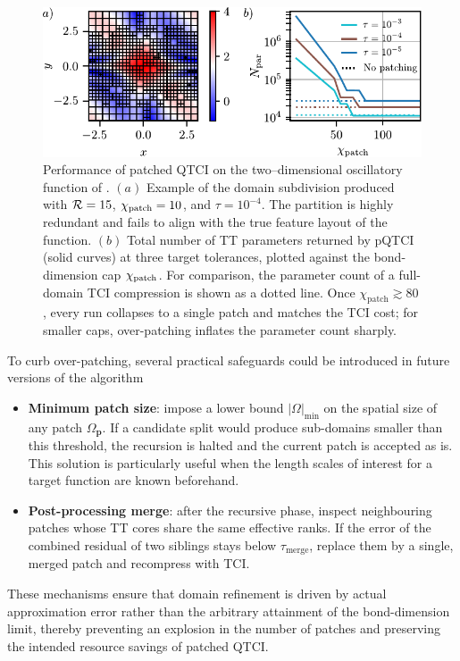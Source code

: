 \begin{figure}[htbp]
	\centering
	\includegraphics{figures/OverPatching.pdf}
	\caption{Performance of patched QTCI on the two–dimensional oscillatory function of .  $(a)$ Example of the domain subdivision produced with $\mathcal{R} = 15$, $\chi_{\text{patch}} = 10$, and $\tau = 10^{-4}$.  The partition is highly redundant and fails to align with the true feature layout of the function. $(b)$ Total number of TT parameters returned by pQTCI (solid curves) at three target tolerances, plotted against the bond-dimension cap $\chi_{\text{patch}}$.  For comparison, the parameter count of a full-domain TCI compression is shown as a dotted line.  Once $\chi_{\text{patch}}\gtrsim 80$, every run collapses to a single patch and matches the TCI cost; for smaller caps, over-patching inflates the parameter count sharply.}
	\label{fig:2DOverpatching}
\end{figure}

To curb over-patching, several practical safeguards could be introduced in future versions of the algorithm
%
\begin{itemize}
  	\item \textbf{Minimum patch size}: impose a lower bound $|\Omega|_{\min}$ on the spatial size of any patch $\Omega_{\mathbf p}$. If a candidate split would produce sub-domains smaller than this threshold, the recursion is halted and the current patch is accepted as is. This solution is particularly useful when the length scales of interest for a target function are known beforehand.
  \item \textbf{Post-processing merge}: after the recursive phase, inspect neighbouring patches whose TT cores share the same effective ranks.  If the error of the combined residual of two siblings stays below $\tau_{\text{merge}}$, replace them by a single, merged patch and recompress with TCI.
\end{itemize}

These mechanisms ensure that domain refinement is driven by actual approximation error rather than the arbitrary attainment of the bond-dimension limit, thereby preventing an explosion in the number of patches and preserving the intended resource savings of patched QTCI.